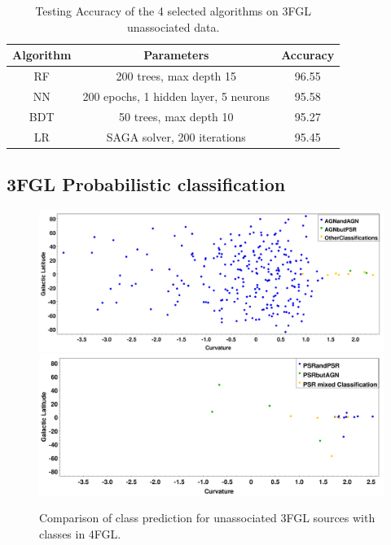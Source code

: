 \begin{table}[!h]
    \tiny
    \centering
    \renewcommand{\tabcolsep}{1mm}
\renewcommand{\arraystretch}{1.5}

    \begin{tabular}{|c|c|c|}
    \hline
    Algorithm&Parameters & Accuracy\\
    \hline
    RF& 200 trees, max depth 15  & 96.55   \\
    \hline
    NN & 200 epochs, 1 hidden layer, 5 neurons &  95.58 \\
    \hline %
    BDT & 50 trees, max depth 10    &   95.27  \\
    \hline
    LR & SAGA solver, 200 iterations & 95.45 \\
    \hline
     
    \end{tabular}

    \caption{Testing Accuracy of the 4 selected algorithms on 3FGL unassociated data.}
    \label{tab:selected_algs}
\end{table}


\subsection{3FGL Probabilistic classification} 

\begin{figure}[h]
\includegraphics[width=\twopicsp\textwidth]{plots/AGN.pdf}
\includegraphics[width=\twopicsp\textwidth]{plots/PSR3.pdf}
\caption{Comparison of class prediction for unassociated 3FGL sources with classes in 4FGL. }
\label{fig:Maps_data}
\end{figure}
